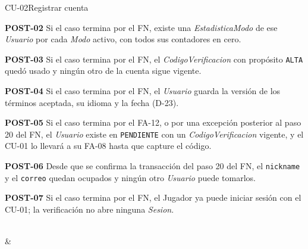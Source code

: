 \begin{fichacu}{CU-02}{Registrar cuenta}
{\begin{cureglas}
      \item \textbf{\mbox{POST-02}} Si el caso termina por el FN, existe una \textit{EstadisticaModo} de ese \textit{Usuario} por cada \textit{Modo} activo, con todos sus contadores en cero.
      \item \textbf{\mbox{POST-03}} Si el caso termina por el FN, el \textit{CodigoVerificacion} con propósito \texttt{ALTA} quedó usado y ningún otro de la cuenta sigue vigente.
      \item \textbf{\mbox{POST-04}} Si el caso termina por el FN, el \textit{Usuario} guarda la versión de los términos aceptada, su idioma y la fecha (\mbox{D-23}).
      \item \textbf{\mbox{POST-05}} Si el caso termina por el \mbox{FA-12}, o por una excepción posterior al paso 20 del FN, el \textit{Usuario} existe en \texttt{PENDIENTE} con un \textit{CodigoVerificacion} vigente, y el \mbox{CU-01} lo llevará a su \mbox{FA-08} hasta que capture el código.
      \item \textbf{\mbox{POST-06}} Desde que se confirma la transacción del paso 20 del FN, el \texttt{nickname} y el \texttt{correo} quedan ocupados y ningún otro \textit{Usuario} puede tomarlos.
      \item \textbf{\mbox{POST-07}} Si el caso termina por el FN, el Jugador ya puede iniciar sesión con el \mbox{CU-01}; la verificación no abre ninguna \textit{Sesion}.
    \end{cureglas}} \\
   &  \\ \hline

\end{fichacu}
